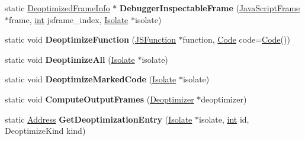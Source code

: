 \begin{DoxyCompactItemize}
\mbox{\label{classv8_1_1internal_1_1Deoptimizer_a5f129cfaa014424fd6ae474e49c76764}} 
static \mbox{\hyperlink{classv8_1_1internal_1_1DeoptimizedFrameInfo}{Deoptimized\+Frame\+Info}} $\ast$ {\bfseries Debugger\+Inspectable\+Frame} (\mbox{\hyperlink{classv8_1_1internal_1_1JavaScriptFrame}{Java\+Script\+Frame}} $\ast$frame, \mbox{\hyperlink{classint}{int}} jsframe\+\_\+index, \mbox{\hyperlink{classv8_1_1internal_1_1Isolate}{Isolate}} $\ast$isolate)
\item 
\mbox{\label{classv8_1_1internal_1_1Deoptimizer_acd0cd16e81e6d8ccbf37b495cf6850f6}} 
static void {\bfseries Deoptimize\+Function} (\mbox{\hyperlink{classv8_1_1internal_1_1JSFunction}{J\+S\+Function}} $\ast$function, \mbox{\hyperlink{classv8_1_1internal_1_1Code}{Code}} code=\mbox{\hyperlink{classv8_1_1internal_1_1Code}{Code}}())
\item 
\mbox{\label{classv8_1_1internal_1_1Deoptimizer_a6bb35276c37391b101bba2759894c2d0}} 
static void {\bfseries Deoptimize\+All} (\mbox{\hyperlink{classv8_1_1internal_1_1Isolate}{Isolate}} $\ast$isolate)
\item 
\mbox{\label{classv8_1_1internal_1_1Deoptimizer_a7cbb81963c0529cc90612511d408db06}} 
static void {\bfseries Deoptimize\+Marked\+Code} (\mbox{\hyperlink{classv8_1_1internal_1_1Isolate}{Isolate}} $\ast$isolate)
\item 
\mbox{\label{classv8_1_1internal_1_1Deoptimizer_a27cf077b48bd6ef6ff9905b2ebccc6c1}} 
static void {\bfseries Compute\+Output\+Frames} (\mbox{\hyperlink{classv8_1_1internal_1_1Deoptimizer}{Deoptimizer}} $\ast$deoptimizer)
\item 
\mbox{\label{classv8_1_1internal_1_1Deoptimizer_aa766b954cd35516026021d30f08f2f37}} 
static \mbox{\hyperlink{classuintptr__t}{Address}} {\bfseries Get\+Deoptimization\+Entry} (\mbox{\hyperlink{classv8_1_1internal_1_1Isolate}{Isolate}} $\ast$isolate, \mbox{\hyperlink{classint}{int}} id, Deoptimize\+Kind kind)
\item 
\mbox{\label{classv8_1_1internal_1_1Deoptimizer_a31109e27a98da31d4bbdc4f3a5afba91}} 

\end{DoxyCompactItemize}
